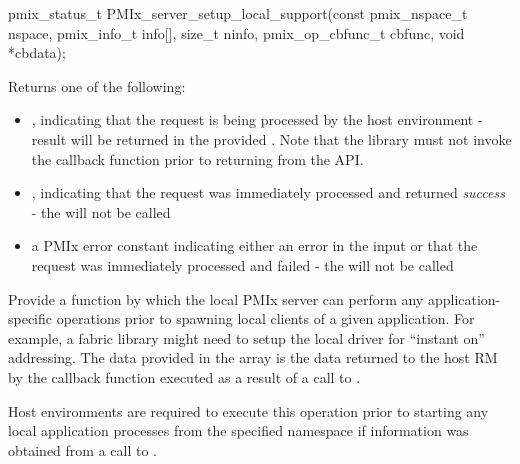 \cspecificstart
\begin{codepar}
pmix_status_t
PMIx_server_setup_local_support(const pmix_nspace_t nspace,
                                pmix_info_t info[], size_t ninfo,
                                pmix_op_cbfunc_t cbfunc,
                                void *cbdata);
\end{codepar}
\cspecificend

\begin{arglist}
\end{arglist}

Returns one of the following:

\begin{itemize}
    \item {}, indicating that the request is being processed by the host environment - result will be returned in the provided . Note that the library must not invoke the callback function prior to returning from the \ac{API}.
    \item {}, indicating that the request was immediately processed and returned \textit{success} - the  will not be called
    \item a PMIx error constant indicating either an error in the input or that the request was immediately processed and failed - the  will not be called
\end{itemize}


\descr

Provide a function by which the local \ac{PMIx} server can perform any application-specific operations prior to spawning local clients of a given application. For example, a fabric library might need to setup the local driver for ``instant on'' addressing. The data provided in the  array is the data returned to the host \ac{RM} by the callback function executed as a result of a call to .

\advicermstart
Host environments are required to execute this operation prior to starting any local application processes from the specified namespace if information was obtained from a call to .
\advicermend

